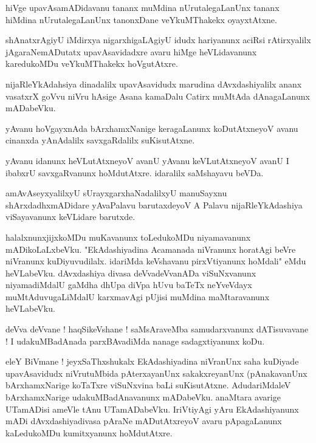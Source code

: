 \documentclass{article}
\begin{document}
\begin{mn}%
hiVge upavAsamADidavanu tananx muMdina nUrutalegaLanUnx tananx hiMdina nUrutalegaLanUnx tanonxDane 
veYkuMThakekx oyayxtAtxne.
\end{mn}

\begin{mn}%
shAnatxrAgiyU iMdirxya nigarxhigaLAgiyU idudx hariyanunx aciRsi rAtirxyalilx jAgaraNemADutatx 
upavAsavidadxre avaru hiMge heVLidavanunx karedukoMDu veYkuMThakekx hoVgutAtxre.
\end{mn}

\begin{mn}%
nijaRleYkAdahsiya dinadalilx upavAsavidudx marudina dAvxdashiyalilx ananx vasatxrX goVvu niVru 
hAsige Asana kamaDalu Catirx muMtAda dAnagaLanunx mADabeVku.
\end{mn}

\begin{mn}%
yAvanu hoVgayxnAda bArxhamxNanige keragaLanunx koDutAtxneyoV avanu cinanxda yAnAdalilx 
savxgaRdalilx suKisutAtxne.
\end{mn}

\begin{mn}%
yAvanu idanunx heVLutAtxneyoV avanU yAvanu keVLutAtxneyoV avanU I ibabxrU savxgaRvanunx 
hoMdutAtxre. idaralilx saMshayavu beVDa.
\end{mn}

\begin{mn}%
amAvAseyxyalilxyU sUrayxgarxhaNadalilxyU manuSayxnu shArxdadhxmADidare yAvaPalavu barutaxdeyoV A 
Palavu nijaRleYkAdashiya viSayavanunx keVLidare barutxde.
\end{mn}

\begin{mn}%
halalxnunxjijxkoMDu muKavanunx toLedukoMDu niyamavanunx mADikoLaLxbeVku. "EkAdashiyadina Acamanada 
niVranunx horatAgi beVre niVranunx kuDiyuvudilalx. idariMda keVshavanu pirxVtiyanunx hoMdali" eMdu 
heVLabeVku. dAvxdashiya divasa deVvadeVvanADa viSuNxvanunx niyamadiMdalU gaMdha dhUpa diVpa hUvu 
baTeTx neYveVdayx muMtAduvugaLiMdalU karxmavAgi pUjisi muMdina maMtaravanunx heVLabeVku.
\end{mn}

\begin{mn}%
deVva deVvane ! haqSikeVshane ! saMsAraveMba samudarxvanunx dATisuvavane ! I udakuMBadAnada 
parxBAvadiMda nanage sadagxtiyanunx koDu.
\end{mn}

\begin{mn}%
eleY BiVmane ! jeyxSaThxshukalx EkAdashiyadina niVranUnx saha kuDiyade upavAsavidudx niVrutuMbida 
pAterxayanUnx sakakxreyanUnx (pAnakavanUnx bArxhamxNarige koTaTxre viSuNxvina baLi suKisutAtxne. 
AdudariMdaleV bArxhamxNarige udakuMBadAnavanunx mADabeVku. anaMtara avarige UTamADisi ameVle tAnu 
UTamADabeVku. IriVtiyAgi yAru EkAdashiyanunx mADi dAvxdashiyadivasa pAraNe mADutAtxreyoV avaru 
pApagaLanunx kaLedukoMDu kumitxyanunx hoMdutAtxre.
\end{mn}
\end{document}
